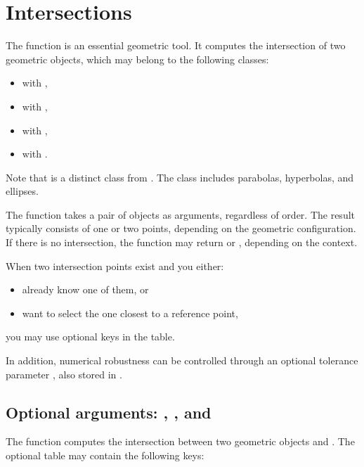 \newpage
\section{Intersections}
\label{sec:intersections}

The  function is an essential geometric tool. It computes the intersection of two geometric objects, which may belong to the following classes:

\begin{itemize}
  \item {} with ,
  \item {} with ,
  \item {} with ,
  \item {} with .
\end{itemize}

Note that  is a distinct class from .
The  class includes parabolas, hyperbolas, and ellipses.

\medskip

The function takes a pair of objects as arguments, regardless of order.
The result typically consists of one or two points, depending on the geometric configuration.
If there is no intersection, the function may return  or \code{\_}, depending on the context.

\medskip

When two intersection points exist and you either:
\begin{itemize}
  \item already know one of them, or
  \item want to select the one closest to a reference point,
\end{itemize}
you may use optional keys in the  table.

In addition, numerical robustness can be controlled through an optional tolerance parameter , also stored in .

\subsection{Optional arguments: , , and }

The function  computes the intersection between two geometric objects  and .
The optional table  may contain the following keys:

